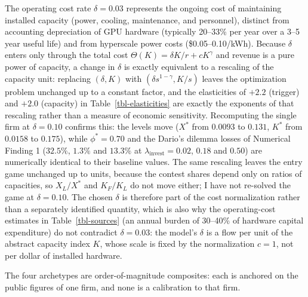 \documentclass[
  11pt,
  letterpaper,
]{scrartcl}
\newcounter{none} %
\begin{document}
The operating cost rate \(\delta = 0.03\) represents the ongoing cost of
maintaining installed capacity (power, cooling, maintenance, and
personnel), distinct from accounting depreciation of GPU hardware
(typically 20--33\% per year over a 3--5 year useful life) and from
hyperscale power costs (\$0.05--0.10/kWh). Because \(\delta\) enters
only through the total cost \(\Theta(K) = \delta K/r + cK^\gamma\) and
revenue is a pure power of capacity, a change in \(\delta\) is exactly
equivalent to a rescaling of the capacity unit: replacing
\((\delta, K)\) with \((\delta s^{1-\gamma}, K/s)\) leaves the
optimization problem unchanged up to a constant factor, and the
elasticities of \(+2.2\) (trigger) and \(+2.0\) (capacity) in
Table~\ref{tbl-elasticities} are exactly the exponents of that rescaling
rather than a measure of economic sensitivity. Recomputing the single
firm at \(\delta = 0.10\) confirms this: the levels move (\(X^*\) from
\(0.0093\) to \(0.131\), \(K^*\) from \(0.0158\) to \(0.175\)), while
\(\phi^* = 0.70\) and the Dario's dilemma losses of Numerical Finding 1
(\(32.5\%\), \(1.3\%\) and \(13.3\%\) at
\(\lambda_{\text{invest}} = 0.02\), \(0.18\) and \(0.50\)) are
numerically identical to their baseline values. The same rescaling
leaves the entry game unchanged up to units, because the contest shares
depend only on ratios of capacities, so \(X_L/X^*\) and \(K_F/K_L\) do
not move either; I have not re-solved the game at \(\delta = 0.10\). The
chosen \(\delta\) is therefore part of the cost normalization rather
than a separately identified quantity, which is also why the
operating-cost estimates in Table~\ref{tbl-sources} (an annual burden of
30--40\% of hardware capital expenditure) do not contradict
\(\delta = 0.03\): the model's \(\delta\) is a flow per unit of the
abstract capacity index \(K\), whose scale is fixed by the normalization
\(c=1\), not per dollar of installed hardware.

The four archetypes are order-of-magnitude composites: each is anchored
on the public figures of one firm, and none is a calibration to that
firm.
\end{document}
